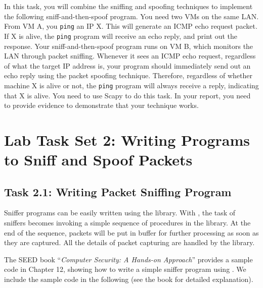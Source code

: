 In this task, you will combine the sniffing and spoofing techniques
to implement the following sniff-and-then-spoof program.
You need two VMs on the same LAN. From VM A, you
{\tt ping} an IP X. This will generate an ICMP echo
request packet. If X is alive, the {\tt ping} program will receive
an echo reply, and print out the response. Your sniff-and-then-spoof
program runs on VM B, which monitors the LAN through packet sniffing. Whenever it
sees an ICMP echo request, regardless of what the target IP address is,
your program should immediately send out an echo reply using the
packet spoofing technique. Therefore, regardless of whether machine X
is alive or not, the {\tt ping} program will always receive
a reply, indicating that X is alive. You need to use Scapy
to do this task. In your report, you need to provide evidence to demonstrate 
that your technique works. 





\section{Lab Task Set 2: Writing Programs to Sniff and Spoof Packets}



\subsection{Task 2.1: Writing Packet Sniffing Program}

Sniffer programs can be easily written using the \pcap library. With \pcap, 
the task of 
sniffers becomes invoking a simple sequence of procedures
in the \pcap library. At the end of the sequence,
packets will be put in buffer for further processing
as soon as they are captured. All the details 
of packet capturing are handled by the \pcap library.


The SEED book ``\textit{Computer Security: A Hands-on Approach}'' provides a sample code 
in Chapter 12, showing how  to write a simple sniffer program using 
\pcap. We include the sample code in the following (see the book for detailed explanation). 

